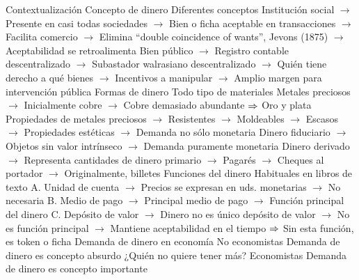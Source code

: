 \documentclass{nuevotema}
\begin{document}
\begin{esquema}[enumerate]
\end{esquema}

\esquemalargo



















\begin{esquemal}
	\1[] 
		\2 Contextualización
			\3 Concepto de dinero
				\4 Diferentes conceptos
				\4[] Institución social
				\4[] $\to$ Presente en casi todas sociedades
				\4[] $\to$ Bien o ficha aceptable en transacciones
				\4[] $\to$ Facilita comercio
				\4[] $\to$ Elimina ``double coincidence of wants'', Jevons (1875)
				\4[] $\to$ Aceptabilidad se retroalimenta
				\4[] Bien público
				\4[] $\to$ Registro contable descentralizado
				\4[] $\to$ Subastador walrasiano descentralizado
				\4[] $\to$ Quién tiene derecho a qué bienes
				\4[] $\to$ Incentivos a manipular
				\4[] $\to$ Amplio margen para intervención pública
				\4 Formas de dinero
				\4[] Todo tipo de materiales
				\4[] Metales preciosos
				\4[] $\to$ Inicialmente cobre
				\4[] $\to$ Cobre demasiado abundante
				\4[] $\Rightarrow$ Oro y plata
				\4[] Propiedades de metales preciosos
				\4[] $\to$ Resistentes
				\4[] $\to$ Moldeables
				\4[] $\to$ Escasos
				\4[] $\to$ Propiedades estéticas
				\4[] $\to$ Demanda no sólo monetaria
				\4[] Dinero fiduciario
				\4[] $\to$ Objetos sin valor intrínseco
				\4[] $\to$ Demanda puramente monetaria
				\4[] Dinero derivado
				\4[] $\to$ Representa cantidades de dinero primario
				\4[] $\to$ Pagarés
				\4[] $\to$ Cheques al portador
				\4[] $\to$ Originalmente, billetes
				\4 Funciones del dinero
				\4[] Habituales en libros de texto
				\4[] A. Unidad de cuenta
				\4[] $\to$ Precios se expresan en uds. monetarias
				\4[] $\to$ No necesaria
				\4[] B. Medio de pago
				\4[] $\to$ Principal medio de pago
				\4[] $\to$ Función principal del dinero
				\4[] C. Depósito de valor
				\4[] $\to$ Dinero no es único depósito de valor
				\4[] $\to$ No es función principal
				\4[] $\to$ Mantiene aceptabilidad en el tiempo
				\4[] $\Rightarrow$ Sin esta función, es token o ficha
			\3 Demanda de dinero en economía
				\4 No economistas
				\4[] Demanda de dinero es concepto absurdo
				\4[] ¿Quién no quiere tener más?
				\4 Economistas
				\4[] Demanda de dinero es concepto importante

\end{esquemal}
\end{document}
